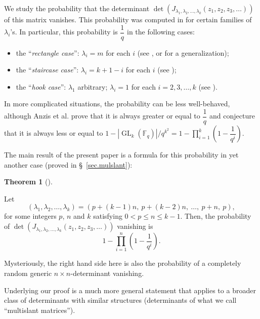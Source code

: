 \documentclass[numbers=enddot,12pt,final,onecolumn,notitlepage]{scrartcl}%
\theoremstyle{definition}
\newtheorem{theo}{Theorem}[section]
\newenvironment{theorem}[1][]
{\begin{theo}[#1]\begin{leftbar}}
{\end{leftbar}\end{theo}}
\let\prodnonlimits\prod
\renewcommand{\prod}{\prodnonlimits\limits}
\newcommand{\abs}[1]{\left| #1 \right|}
\newcommand{\tup}[1]{\left( #1 \right)}
\newcommand{\Fq}{\mathbb{F}_q}
\renewcommand{\leq}{\leqslant}
\theoremstyle{plainsl}
\begin{document}
We study the probability that the determinant
$\det\tup{ J_{\lambda_1, \lambda_2, \ldots, \lambda_k}\tup{z_1, z_2, z_3, \ldots} }$
of this matrix vanishes.
This probability was computed in
\cite{Anzis18} for certain families of $\lambda_i$'s.
In particular, this probability is $\dfrac{1}{q}$ in the following cases:
\begin{itemize}
\item the ``\emph{rectangle case}'': $\lambda_i = m$ for each $i$ (see \cite[Corollary 6.4]{Anzis18}, or \cite{dwivedi2021rank} for a generalization);
\item the ``\emph{staircase case}'': $\lambda_i = k+1-i$ for each $i$ (see \cite[Theorem 6.5]{Anzis18});
\item the ``\emph{hook case}'': $\lambda_1$ arbitrary; $\lambda_i = 1$ for
each $i = 2, 3, \ldots, k$ (see \cite[Proposition 1.2]{Anzis18}).
\end{itemize}
In more complicated situations, the probability can be less well-behaved,
although Anzis et al. prove \cite[Corollary 5.2]{Anzis18} that it is
always greater or equal to $\dfrac{1}{q}$ and conjecture
\cite[Conjecture 5.10]{Anzis18} that it is always less or equal to
$1 - \abs{\operatorname{GL}_k\tup{\Fq}} / q^{k^2}
= 1 - \prod_{i=1}^k \tup{1 - \dfrac{1}{q^i}}$.

The main result of the present paper is a formula for this probability
in yet another case (proved in \S\ \ref{sec.mulslant}):

\begin{theorem}
\label{thm.n.staircase-intro}
Let
\[\left(\lambda_1, \lambda_2, \ldots, \lambda_k\right)
= (p+(k-1)n, \ p+(k-2)n, \ \ldots, \ p+n, \  p) , \]
for some integers $p$, $n$ and $k$ satisfying $0 < p \leq n \leq k-1$.
Then, the probability of
$\det\tup{ J_{\lambda_1, \lambda_2, \ldots, \lambda_k}\tup{z_1, z_2, z_3, \ldots} }$
vanishing is
\[
1- \prod_{i=1}^{n} \left(  1-\dfrac{1}{q^{i}}\right) .
\]
\end{theorem}
Mysteriously, the right hand side here is also the probability of a completely random generic $n\times n$-determinant vanishing.


Underlying
our proof is a much more general statement that applies to a broader
class of determinants with similar structures (determinants of
what we call ``multislant matrices'').
\end{document}
